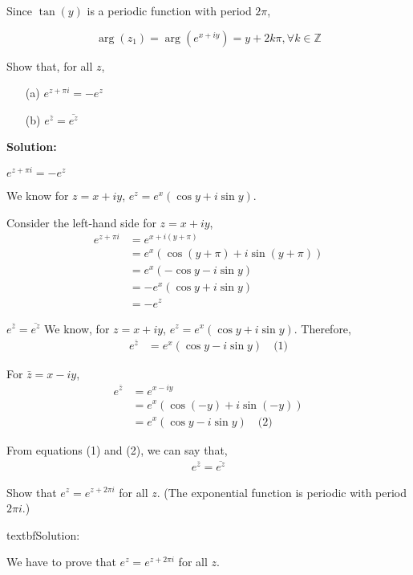 Since \( \tan(y) \) is a periodic function with period \( 2\pi \),

\[
\arg(z_1) = \arg(e^{x+iy}) = y + 2k\pi, \forall k \in \mathbb{Z}
\]
\begin{exercise}
    Show that, for all \( z \),
\begin{enumerate}
    \item[(a)] \( e^{z+\pi i} = -e^z \)
    \item[(b)] \( e^{\bar{z}} = \overline{e^z} \)
\end{enumerate}
\end{exercise}\textbf{Solution:}

\( e^{z+\pi i} = -e^z \)

We know for \( z = x + iy \), \( e^z = e^{x}(\cos y + i \sin y) \).

Consider the left-hand side for \( z = x + iy \),
\begin{align*}
e^{z+\pi i} &= e^{x+i(y+\pi)} \\
&= e^{x}(\cos(y + \pi) + i \sin(y + \pi)) \\
&= e^{x}(-\cos y - i \sin y) \\
&= -e^{x}(\cos y + i \sin y) \\
&= -e^z
\end{align*}


\( e^{\bar{z}} = \overline{e^z} \)
We know, for \( z = x + iy \), \( e^z = e^{x}(\cos y + i \sin y) \). Therefore,
\begin{align*}
e^{\bar{z}} &= e^{x}(\cos y - i \sin y) \quad \text{(1)}
\end{align*}

For \( \bar{z} = x - iy \),
\begin{align*}
e^{\bar{z}} &= e^{x-i y} \\
&= e^{x}(\cos(-y) + i \sin(-y)) \\
&= e^{x}(\cos y - i \sin y) \quad \text{(2)}
\end{align*}

From equations (1) and (2), we can say that,
\begin{align*}
e^{\bar{z}} = \overline{e^z}
\end{align*}

\begin{exercise}
    Show that \( e^z = e^{z+2\pi i} \) for all \( z \). (The exponential function is periodic with period \( 2\pi i \).)
\end{exercise} textbf{Solution:}

We have to prove that \( e^z = e^{z+2\pi i} \) for all \( z \).

